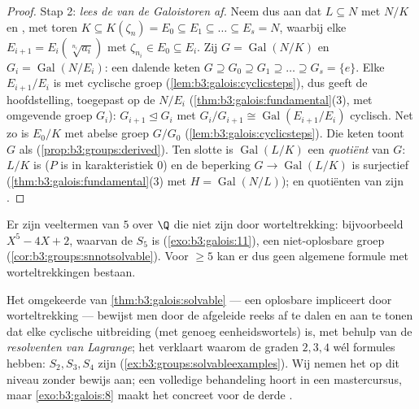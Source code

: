 \begin{proof}
Stap 2: \emph{lees de  van de Galoistoren af.} Neem
dus aan dat $L \subseteq N$ met $N/K$  en , met
toren $K \subseteq K(\zeta_n) = E_0 \subseteq E_1 \subseteq \dots
\subseteq E_s = N$, waarbij elke $E_{i+1} =
E_i(\sqrt[n_i]{a_i})$ met $\zeta_{n_i} \in E_0 \subseteq E_i$. Zij
$G = \operatorname{Gal}(N/K)$ en $G_i = \operatorname{Gal}(N/E_i)$:
een dalende keten $G \supseteq G_0 \supseteq G_1 \supseteq \dots
\supseteq G_s = \{e\}$. Elke $E_{i+1}/E_i$ is  met
cyclische groep (\cref{lem:b3:galois:cyclicsteps}), dus geeft de
hoofdstelling, toegepast op de  $N/E_i$
(\cref{thm:b3:galois:fundamental}(3), met omgevende groep $G_i$):
$G_{i+1} \trianglelefteq G_i$ met $G_i/G_{i+1} \cong
\operatorname{Gal}(E_{i+1}/E_i)$ cyclisch. Net zo is $E_0/K$
 met abelse groep $G/G_0$
(\cref{lem:b3:galois:cyclicsteps}). Die keten toont $G$ als
 (\cref{prop:b3:groups:derived}). Ten slotte is
$\operatorname{Gal}(L/K)$ een \emph{quotiënt} van $G$: $L/K$ is
 ($P$ is  in karakteristiek $0$) en de beperking $G
\to \operatorname{Gal}(L/K)$ is surjectief
(\cref{thm:b3:galois:fundamental}(3) met $H =
\operatorname{Gal}(N/L)$); en quotiënten van 
zijn .
\end{proof}

\begin{corollary}
\label{cor:b3:galois:quintic}
Er zijn veeltermen van  $5$ over $\Q$ die niet  zijn
door worteltrekking: bijvoorbeeld $X^5 - 4X + 2$, waarvan de
 $S_5$ is (\cref{exo:b3:galois:11}), een niet-oplosbare
groep (\cref{cor:b3:groups:snnotsolvable}). Voor  $\geq 5$
kan er dus geen algemene formule met worteltrekkingen
bestaan.
\end{corollary}

\begin{remark}\label{rem:b3:galois:converse}
Het omgekeerde van \cref{thm:b3:galois:solvable} --- een oplosbare
 impliceert  door worteltrekking ---
bewijst men door de afgeleide reeks af te dalen en aan te tonen
dat elke cyclische uitbreiding (met genoeg eenheidswortels)
 is, met behulp van de \emph{resolventen van Lagrange};
het verklaart waarom de graden $2, 3, 4$ wél formules hebben:
$S_2, S_3, S_4$ zijn 
(\cref{ex:b3:groups:solvableexamples}). Wij nemen het op dit
niveau zonder bewijs aan; een volledige behandeling hoort in een
mastercursus, maar \cref{exo:b3:galois:8} maakt het concreet voor
de derde .
\end{remark}

